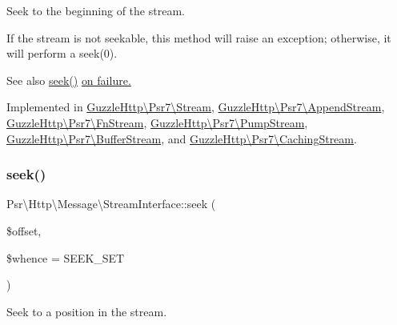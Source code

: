 Seek to the beginning of the stream.

If the stream is not seekable, this method will raise an exception; otherwise, it will perform a seek(0).

\begin{DoxySeeAlso}{See also}
\hyperlink{interfacePsr_1_1Http_1_1Message_1_1StreamInterface_a96ee062dc6cf4022d655dd15eaa81208}{seek()} \hyperlink{}{on failure. }
\end{DoxySeeAlso}


Implemented in \hyperlink{classGuzzleHttp_1_1Psr7_1_1Stream_abe54d2885cbc219347016c3ccfed1055}{Guzzle\+Http\textbackslash{}\+Psr7\textbackslash{}\+Stream}, \hyperlink{classGuzzleHttp_1_1Psr7_1_1AppendStream_a39b5d3ea1bcfedcffa3c0210aacb1ae2}{Guzzle\+Http\textbackslash{}\+Psr7\textbackslash{}\+Append\+Stream}, \hyperlink{classGuzzleHttp_1_1Psr7_1_1FnStream_a8b27960dc20fe35531b4d1c2f124b605}{Guzzle\+Http\textbackslash{}\+Psr7\textbackslash{}\+Fn\+Stream}, \hyperlink{classGuzzleHttp_1_1Psr7_1_1PumpStream_adc397c8abc8205c9aaefc12ff3bd1bfa}{Guzzle\+Http\textbackslash{}\+Psr7\textbackslash{}\+Pump\+Stream}, \hyperlink{classGuzzleHttp_1_1Psr7_1_1BufferStream_a93beb4e6194db7b3ce2f39748d99fdc0}{Guzzle\+Http\textbackslash{}\+Psr7\textbackslash{}\+Buffer\+Stream}, and \hyperlink{classGuzzleHttp_1_1Psr7_1_1CachingStream_ab893b58302d56d6946ca7355b5816ae4}{Guzzle\+Http\textbackslash{}\+Psr7\textbackslash{}\+Caching\+Stream}.

\mbox{\label{interfacePsr_1_1Http_1_1Message_1_1StreamInterface_a96ee062dc6cf4022d655dd15eaa81208}} 
\subsubsection{\texorpdfstring{seek()}{seek()}}
{\footnotesize\ttfamily Psr\textbackslash{}\+Http\textbackslash{}\+Message\textbackslash{}\+Stream\+Interface\+::seek (\begin{DoxyParamCaption}\item[{}]{\$offset,  }\item[{}]{\$whence = {\ttfamily SEEK\+\_\+SET} }\end{DoxyParamCaption})}

Seek to a position in the stream.

